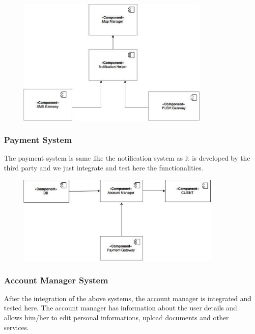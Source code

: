 \begin{figure}[h]
	\centering
	\includegraphics[height=6.285cm,keepaspectratio]{figures/components_notification.eps}
	\label{fig:components_notification}
\end{figure}

\subsubsection*{Payment System}
The payment system is same like the notification system as it is developed by the third party and we just integrate and test here the functionalities.

\newpage
\begin{figure}[h]
	\centering
	\includegraphics[height=4.38cm,keepaspectratio]{figures/components_payment.eps}
	\label{fig:components_payment}
\end{figure}

\subsubsection*{Account Manager System}
After the integration of the above systems, the account manager is integrated and tested here. The account manager has information about the user details and allows
him/her to edit personal informations, upload documents and other services. 

